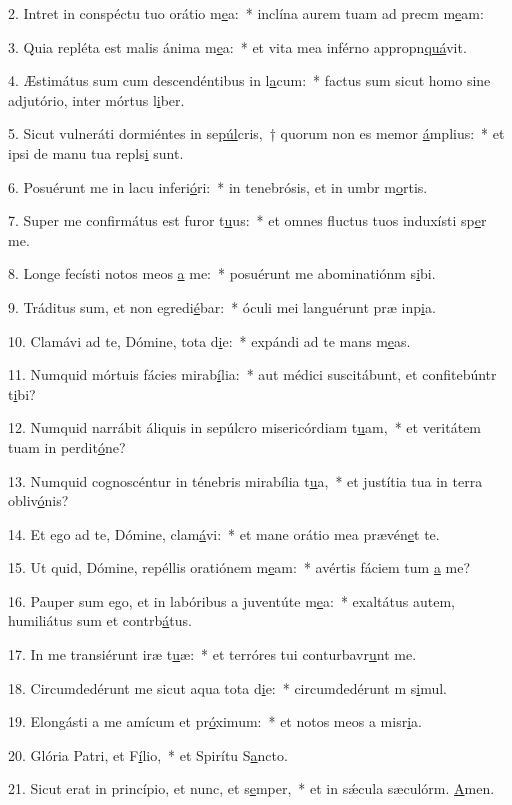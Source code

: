 2. Intret in conspéctu tuo orátio m\uline{e}a:~* inclína aurem tuam ad precm m\uline{e}am:\par 
3. Quia repléta est malis ánima m\uline{e}a:~* et vita mea inférno appropn\uline{quá}vit.\par 
4. Æstimátus sum cum descendéntibus in l\uline{a}cum:~* factus sum sicut homo sine adjutório, inter mórtus l\uline{i}ber.\par 
5. Sicut vulneráti dormiéntes in se\uline{púl}cris,~† quorum non es memor \uline{á}mplius:~* et ipsi de manu tua repls\uline{i} sunt.\par 
6. Posuérunt me in lacu inferi\uline{ó}ri:~* in tenebrósis, et in umbr m\uline{o}rtis.\par 
7. Super me confirmátus est furor t\uline{u}us:~* et omnes fluctus tuos induxísti sp\uline{e}r me.\par 
8. Longe fecísti notos meos \uline{a} me:~* posuérunt me abominatiónm s\uline{i}bi.\par 
9. Tráditus sum, et non egredi\uline{é}bar:~* óculi mei languérunt præ inp\uline{i}a.\par 
10. Clamávi ad te, Dómine, tota d\uline{i}e:~* expándi ad te mans m\uline{e}as.\par 
11. Numquid mórtuis fácies mirab\uline{í}lia:~* aut médici suscitábunt, et confitebúntr t\uline{i}bi?\par 
12. Numquid narrábit áliquis in sepúlcro misericórdiam t\uline{u}am,~* et veritátem tuam in perdit\uline{ó}ne?\par 
13. Numquid cognoscéntur in ténebris mirabília t\uline{u}a,~* et justítia tua in terra obliv\uline{ó}nis?\par 
14. Et ego ad te, Dómine, clam\uline{á}vi:~* et mane orátio mea prævén\uline{e}t te.\par 
15. Ut quid, Dómine, repéllis oratiónem m\uline{e}am:~* avértis fáciem tum \uline{a} me?\par 
16. Pauper sum ego, et in labóribus a juventúte m\uline{e}a:~* exaltátus autem, humiliátus sum et contrb\uline{á}tus.\par 
17. In me transiérunt iræ t\uline{u}æ:~* et terróres tui conturbavr\uline{u}nt me.\par 
18. Circumdedérunt me sicut aqua tota d\uline{i}e:~* circumdedérunt m s\uline{i}mul.\par 
19. Elongásti a me amícum et pr\uline{ó}ximum:~* et notos meos a misr\uline{i}a.\par 
20. Glória Patri, et F\uline{í}lio,~* et Spirítu S\uline{a}ncto.\par 
21. Sicut erat in princípio, et nunc, et s\uline{e}mper,~* et in sǽcula sæculórm. \uline{A}men.\par 
